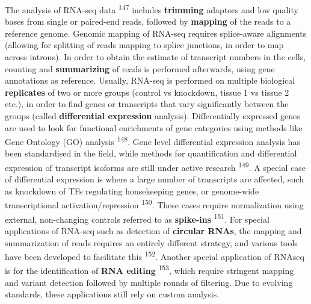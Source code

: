 \documentclass[11pt,twoside]{MPIthesis}
\theoremstyle{definition}
\theoremstyle{definition}
\theoremstyle{definition}
\theoremstyle{remark}
\begin{document}
The analysis of RNA-seq data \textsuperscript{147} includes
\textbf{trimming} adaptors and low quality bases from single or
paired-end reads, followed by \textbf{mapping} of the reads to a
reference genome. Genomic mapping of RNA-seq requires splice-aware
alignments (allowing for splitting of reads mapping to splice junctions,
in order to map across introns). In order to obtain the estimate of
transcript numbers in the cells, counting and \textbf{summarizing} of
reads is performed afterwards, using gene annotations as reference.
Usually, RNA-seq is performed on multiple biological \textbf{replicates}
of two or more groups (control vs knockdown, tissue 1 vs tissue 2 etc.),
in order to find genes or transcripts that vary significantly between
the groups (called \textbf{differential expression} analysis).
Differentially expressed genes are used to look for functional
enrichments of gene categories using methods like Gene Ontology (GO)
analysis \textsuperscript{148}. Gene level differential expression
analysis has been standardised in the field, while methods for
quantification and differential expression of transcript isoforms are
still under active research \textsuperscript{149}. A special case of
differential expression is where a large number of transcripts are
affected, such as knockdown of TFs regulating housekeeping genes, or
genome-wide transcriptional activation/repression \textsuperscript{150}.
These cases require normalization using external, non-changing controls
referred to as \textbf{spike-ins} \textsuperscript{151}. For special
applications of RNA-seq such as detection of \textbf{circular RNAs}, the
mapping and summarization of reads requires an entirely different
strategy, and various tools have been developed to facilitate this
\textsuperscript{152}. Another special application of RNAseq is for the
identification of \textbf{RNA editing} \textsuperscript{153}, which
require stringent mapping and variant detection followed by multiple
rounds of filtering. Due to evolving standards, these applications still
rely on custom analysis.
\end{document}
